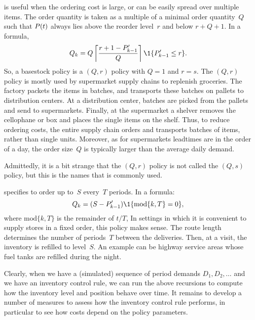 \documentclass[stochastic-or.tex]{subfiles}
\begin{document}
 is useful when the ordering cost is large, or can be easily spread over multiple items.
The order quantity is taken as a multiple of a minimal order quantity~$Q$ such that $P(t)$ always lies above the reorder level~$r$ and below $r+Q+1$.
In a formula,
\begin{equation*}
  Q_k = Q \left\lceil \frac{r+1-\IP_{k-1}'}{Q} \right\rceil \1{\IP_{k-1}'\leq r}.
\end{equation*}
So, a basestock policy is a $(Q,r)$ policy with $Q=1$ and $r=s$.
The $(Q,r)$ policy is mostly used by  supermarket supply chains to replenish groceries.
The factory packets the items in batches, and transports these batches on pallets to distribution centers.
At a distribution center, batches are picked from the pallets and send to supermarkets.
Finally, at the supermarket a shelver removes the cellophane or box and places the single items on the shelf.
Thus, to reduce ordering costs, the entire supply chain orders and transports batches of items, rather than single units.
Moreover, as for supermarkets leadtimes are  in the order of a day, the  order size~$Q$ is typically larger than the average daily demand.

Admittedly, it is a bit strange that the $(Q,r)$ policy is not called the $(Q,s)$ policy, but this is the names that is commonly used.


  specifies to order up to~$S$ every~$T$ periods. In a formula:
\begin{equation*}
  Q_k = (S-\IP_{k-1}')\1{\text{mod}\{k, T\}=0},
\end{equation*}
where $\text{mod}\{k, T\}$ is the remainder of $t/T$, In settings in which it is convenient to supply stores in a fixed order, this policy makes sense.
The route length determines the number of periods~$T$ between the deliveries.
Then, at a visit, the inventory is refilled to level~$S$. An example can be highway service areas whose fuel tanks are refilled during the night.


Clearly, when we have a (simulated) sequence of period demands $D_{1}, D_{2}, \ldots$ and we have an inventory control rule, we can run the above recursions to compute how the inventory level and position behave over time.
It remains to develop a number of measures to assess how the inventory control rule performs, in particular to see how costs depend on the policy parameters.
\end{document}
